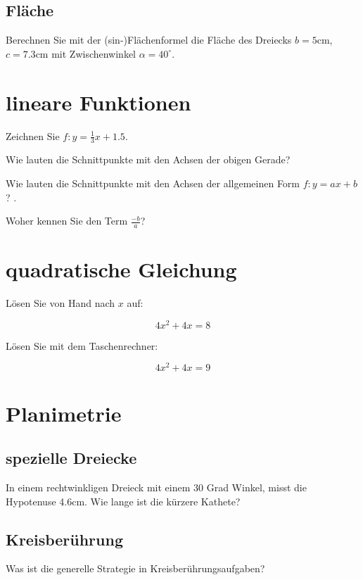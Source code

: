 \subsection{Fläche}
Berechnen Sie mit der (sin-)Flächenformel die Fläche des Dreiecks $b = 5$cm, $c=7.3$cm mit Zwischenwinkel $\alpha{} = 40^{\circ{}}$. 

\section{lineare Funktionen}
Zeichnen Sie $f: y=\frac{1}{3}x+1.5$.

Wie lauten die Schnittpunkte mit den Achsen der obigen Gerade?

Wie lauten die Schnittpunkte mit den Achsen der allgemeinen Form $f: y=ax+b$? .

Woher kennen Sie den Term $\frac{-b}{a}$?

\section{quadratische Gleichung}
Lösen Sie von Hand nach $x$ auf:

$$4x^2 +4x = 8$$

Lösen Sie mit dem Taschenrechner:

$$4x^2 + 4x = 9$$


\noTRAINER{\newpage}

\section{Planimetrie}
\subsection{spezielle Dreiecke}
In einem rechtwinkligen Dreieck mit einem 30 Grad Winkel, misst die Hypotenuse 4.6cm. Wie lange ist die kürzere Kathete? 

\subsection{Kreisberührung}
Was ist die generelle Strategie in Kreisberührungsaufgaben?

